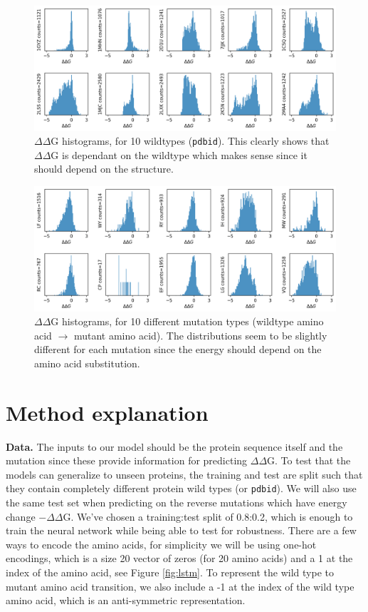 \documentclass{article}
\newcommand{\dd}{$\Delta\Delta$}
\begin{document}
\FloatBarrier

\begin{figure}[!htb]
    \centering
    \includegraphics[width=\textwidth]{plots/wildtype.png}
    \caption{$\Delta\Delta$G histograms, for 10 wildtypes (\texttt{pdbid}). This clearly shows that \dd G is dependant on the wildtype which makes sense since it should depend on the structure.}
    \label{fig:wildtype}
\end{figure}
\FloatBarrier

\begin{figure}[!htb]
    \centering
    \includegraphics[width=\textwidth]{plots/mutation.png}
    \caption{$\Delta\Delta$G histograms, for 10 different mutation types (wildtype amino acid $\rightarrow$ mutant amino acid). The distributions seem to be slightly different for each mutation since the energy should depend on the amino acid substitution.}
    \label{fig:mutation}
\end{figure}
\FloatBarrier

\section{Method explanation}

\textbf{Data.} The inputs to our model should be the protein sequence itself and the mutation since these provide information for predicting $\Delta\Delta$G. To test that the models can generalize to unseen proteins, the training and test are split such that they contain completely different protein wild types (or \texttt{pdbid}). We will also use the same test set when predicting on the reverse mutations which have energy change $-\Delta\Delta$G. We've chosen a training:test split of 0.8:0.2, which is enough to train the neural network while being able to test for robustness. There are a few ways to encode the amino acids, for simplicity we will be using one-hot encodings, which is a size 20 vector of zeros (for 20 amino acids) and a 1 at the index of the amino acid, see Figure \ref{fig:lstm}. To represent the wild type to mutant amino acid transition, we also include a -1  at the index of the wild type amino acid, which is an anti-symmetric representation.
\clearpage
\end{document}
